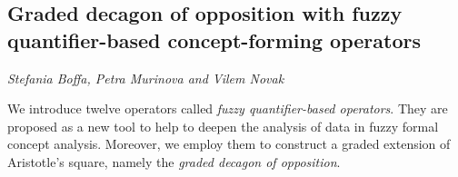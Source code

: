 \documentclass[../booklet.tex]{subfiles}
\begin{document}
\subsection[Graded decagon of opposition with fuzzy quantifier-based concept-forming operators. {\it Stefania Boffa, Petra Murinova and Vilem Novak}]{Graded decagon of opposition with fuzzy quantifier-based concept-forming operators}
  

\begin{center}
  {\it Stefania Boffa, Petra Murinova and Vilem Novak}
\end{center}



We introduce twelve operators called \emph{fuzzy quantifier-based operators}. They are proposed as a new tool to help to deepen the analysis of data in fuzzy formal concept analysis. 
 Moreover, we employ them to construct a graded extension of Aristotle's square, namely the \emph{graded decagon of opposition}.
%
\end{document}

